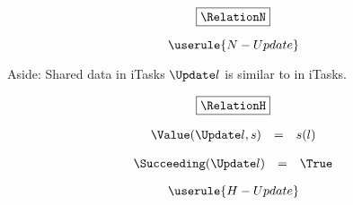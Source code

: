 \begin{equation*}
  \boxed{\RelationN}
\end{equation*}

\begin{equation*}
  \userule{N-Update}
\end{equation*}

\begin{margintext}{Aside: Shared data in iTasks}
  $\Update l$ is similar to  in iTasks.
\end{margintext}

\begin{equation*}
  \boxed{\RelationH}
\end{equation*}

\begin{equation*}
  \begin{array}{lcl}
    \Value(\Update l, s) &=& s(l)
  \end{array}
\end{equation*}

\begin{equation*}
  \begin{array}{lcl}
    \Succeeding(\Update l) &=& \True
  \end{array}
\end{equation*}

\begin{equation*}
  \userule{H-Update}
\end{equation*}
